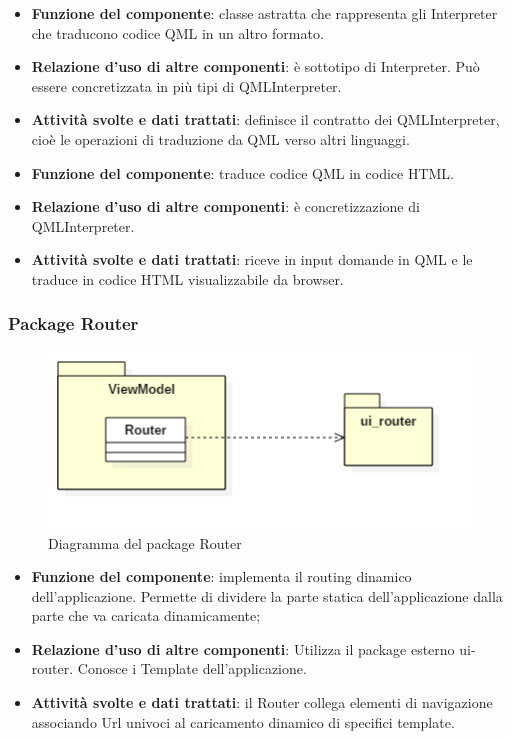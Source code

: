 \begin{itemize}
	\item\textbf{Funzione del componente}: classe astratta che rappresenta gli Interpreter che traducono codice QML in un altro formato.
	\item\textbf{Relazione d'uso di altre componenti}: è sottotipo di Interpreter. Può essere concretizzata in più tipi di QMLInterpreter.
	\item\textbf{Attività svolte e dati trattati}: definisce il contratto dei QMLInterpreter, cioè le operazioni di traduzione da QML verso altri linguaggi.
\end{itemize}
\begin{itemize}
	\item\textbf{Funzione del componente}: traduce codice QML in codice HTML.
	\item\textbf{Relazione d'uso di altre componenti}: è concretizzazione di QMLInterpreter.
	\item\textbf{Attività svolte e dati trattati}: riceve in input domande in QML e le traduce in codice HTML visualizzabile da browser.
\end{itemize}

\subsubsection{Package Router}
\begin{figure}[h!]
\begin{center}
	\includegraphics[scale=0.65]{../images/Router.png}
	\caption{Diagramma del package Router}
\end{center}
\end{figure}
\begin{itemize}
	\item\textbf{Funzione del componente}: implementa il routing dinamico dell'applicazione. Permette di dividere la parte statica dell'applicazione dalla parte che va caricata dinamicamente;
	\item\textbf{Relazione d'uso di altre componenti}: Utilizza il package esterno ui-router. Conosce i Template dell'applicazione.
	\item\textbf{Attività svolte e dati trattati}: il Router collega elementi di navigazione associando Url univoci al caricamento dinamico di specifici template.

\end{itemize}

\newpage